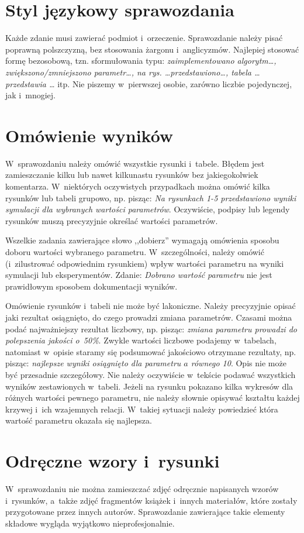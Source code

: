 \section{Styl językowy sprawozdania}
Każde zdanie musi zawierać podmiot i~orzeczenie. Sprawozdanie należy pisać poprawną polszczyzną, bez stosowania żargonu i~anglicyzmów. Najlepiej stosować formę bezosobową, tzn. sformułowania typu: \emph{zaimplementowano algorytm\ldots, zwiększono/zmniejszono parametr\ldots, na rys. \ldots przedstawiono\ldots, tabela \ldots przedstawia \ldots} itp. Nie piszemy w~pierwszej osobie, zarówno liczbie pojedynczej, jak i~mnogiej.

\section{Omówienie wyników}
W~sprawozdaniu należy omówić wszystkie rysunki i~tabele. Błędem jest zamieszczanie kilku lub nawet kilkunastu rysunków bez jakiegokolwiek komentarza. W~niektórych oczywistych przypadkach można omówić kilka rysunków lub tabeli grupowo, np. pisząc: \emph{Na rysunkach 1-5 przedstawiono wyniki symulacji dla wybranych wartości parametrów}. Oczywiście, podpisy lub legendy rysunków muszą precyzyjnie określać wartości parametrów.

Wszelkie zadania zawierające słowo ,,dobierz'' wymagają omówienia sposobu doboru wartości wybranego parametru. W~szczególności, należy omówić (i~zilustrować odpowiednim rysunkiem) wpływ wartości parametru na wyniki symulacji lub eksperymentów. Zdanie: \emph{Dobrano wartość parametru} nie jest prawidłowym sposobem dokumentacji wyników.

Omówienie rysunków i~tabeli nie może być lakoniczne. Należy precyzyjnie opisać jaki rezultat osiągnięto, do czego prowadzi zmiana parametrów. Czasami można podać najważniejszy rezultat liczbowy, np. pisząc: \emph{zmiana parametru prowadzi do polepszenia jakości o~50\%}. Zwykle wartości liczbowe podajemy w~tabelach, natomiast w~opisie staramy się podsumować jakościowo otrzymane rezultaty, np. pisząc: \emph{najlepsze wyniki osiągnięto dla parametru $a$ równego 10}. Opis nie może być przesadnie szczegółowy. Nie należy oczywiście w~tekście podawać wszystkich wyników zestawionych w~tabeli. Jeżeli na rysunku pokazano kilka wykresów dla różnych wartości pewnego parametru, nie należy słownie opisywać kształtu każdej krzywej i~ich wzajemnych relacji. W~takiej sytuacji należy powiedzieć która wartość parametru okazała się najlepsza.

\section{Odręczne wzory i~rysunki}
W~sprawozdaniu nie można zamieszczać zdjęć odręcznie napisanych wzorów i~rysunków, a~także zdjęć fragmentów książek i~innych materiałów, które zostały przygotowane przez innych autorów. Sprawozdanie zawierające takie elementy składowe wygląda wyjątkowo nieprofesjonalnie.

